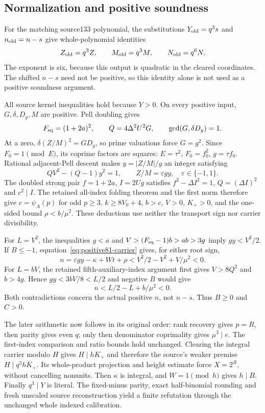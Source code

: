 \subsection{Normalization and positive soundness}
For the matching source133 polynomial, the substitutions
$Y_{\rm old}=q^3s$ and $n_{\rm old}=n-s$ give whole-polynomial identities
\[
 Z_{\rm old}=q^3Z,\qquad M_{\rm old}=q^3M,
 \qquad N_{\rm old}=q^6N.
\]
The exponent is six, because this output is quadratic in the cleared
coordinates. The shifted $n-s$ need not be positive, so this identity alone
is not used as a positive soundness argument.

All source kernel inequalities hold because $Y>0$. On every positive
input, $G,\delta,D_y,M$ are positive. Pell doubling gives
\[
 F_{\rm sq}=(1+2a)^2,\qquad Q=4\Delta^2U^2G,
 \qquad \gcd(G,\delta D_y)=1.
\]
At a zero, $\delta(Z/M)^2=GD_y$, so prime valuations force $G=g^2$.
Since $F_0=1\pmod E$, its coprime factors are squares:
$E=\tau^2$, $F_0=f_0^2$, $g=\tau f_0$.
Rational adjacent-Pell descent makes
$y=|Z/M|/g$ an integer satisfying
\[
 QV^2-(Q-1)y^2=1,\qquad Z/M=\varepsilon gy,
 \quad \varepsilon\in\{-1,1\}.
\]
The doubled strong pair $f=1+2a$, $I=2Ug$ satisfies
$f^2-\Delta I^2=1$, $Q=(\Delta I)^2$ and $c^2\mid I$.
The retained all-index folding theorem and the first norm therefore give
$c=\psi_A(p)$ for odd $p\ge3$, $k\ge8V_0+4$, $b>c$,
$V>0$, $K_+>0$, and the one-sided bound $\rho<b/\mu^2$.
These deductions use neither the transport sign nor carrier divisibility.

For $L=V^2$, the inequalities $g<a$ and
$V>(F_{\rm sq}-1)b>ab>3g$ imply $gy<V^2/2$.
If $B\le-1$, equation~\eqref{eq:positive81-carrier} gives, for either
root sign,
\[
 n=\varepsilon gy-\kappa+Wt+\rho
 <V^2/2-V^2+V/\mu^2<0.
\]
For $L=bV$, the retained fifth-auxiliary-index argument first gives
$V>8Q^2$ and $b>4g$. Hence $gy<3bV/8<L/2$ and negative $B$ would give
\[
 n<L/2-L+b/\mu^2<0.
\]
Both contradictions concern the actual positive $n$, not $n-s$.
Thus $B\ge0$ and $C>0$.

The later arithmetic now follows in its original order: rank recovery
gives $p=R$, then parity gives even $q$; only then denominator coprimality
gives $\mu^2\mid e$. The first-index comparison and ratio bounds hold
unchanged. Clearing the integral carrier modulo $H$ gives
$H\mid hK_+$ and therefore the source's weaker premise
$H\mid q^3hK_+$. Its whole-product projection and height estimate force
$X=2^R$, without cancelling nonunits. Then $\kappa$ is integral, and
$W=1\pmod h$ gives $h\mid B$. Finally $q^3\mid Y$ is literal.
The fixed-minus parity, exact half-binomial rounding and fresh unscaled
source reconstruction yield a finite refutation through the unchanged
whole indexed calibration.

